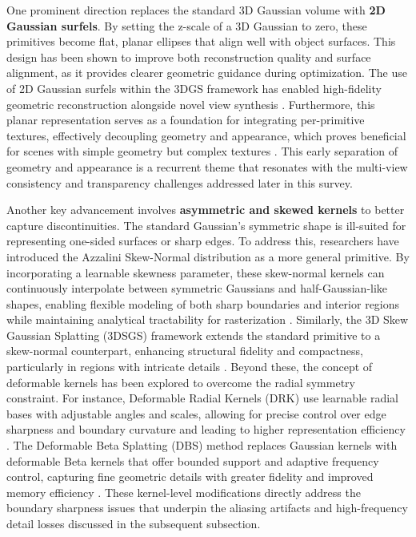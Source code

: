 \documentclass[11pt]{article}
\begin{document}
One prominent direction replaces the standard 3D Gaussian volume with \textbf{2D Gaussian surfels}. By setting the z-scale of a 3D Gaussian to zero, these primitives become flat, planar ellipses that align well with object surfaces. This design has been shown to improve both reconstruction quality and surface alignment, as it provides clearer geometric guidance during optimization. The use of 2D Gaussian surfels within the 3DGS framework has enabled high-fidelity geometric reconstruction alongside novel view synthesis \cite{ref21}. Furthermore, this planar representation serves as a foundation for integrating per-primitive textures, effectively decoupling geometry and appearance, which proves beneficial for scenes with simple geometry but complex textures \cite{ref55}. This early separation of geometry and appearance is a recurrent theme that resonates with the multi-view consistency and transparency challenges addressed later in this survey.

Another key advancement involves \textbf{asymmetric and skewed kernels} to better capture discontinuities. The standard Gaussian's symmetric shape is ill-suited for representing one-sided surfaces or sharp edges. To address this, researchers have introduced the Azzalini Skew-Normal distribution as a more general primitive. By incorporating a learnable skewness parameter, these skew-normal kernels can continuously interpolate between symmetric Gaussians and half-Gaussian-like shapes, enabling flexible modeling of both sharp boundaries and interior regions while maintaining analytical tractability for rasterization \cite{ref56}. Similarly, the 3D Skew Gaussian Splatting (3DSGS) framework extends the standard primitive to a skew-normal counterpart, enhancing structural fidelity and compactness, particularly in regions with intricate details \cite{ref57}. Beyond these, the concept of deformable kernels has been explored to overcome the radial symmetry constraint. For instance, Deformable Radial Kernels (DRK) use learnable radial bases with adjustable angles and scales, allowing for precise control over edge sharpness and boundary curvature and leading to higher representation efficiency \cite{ref58}. The Deformable Beta Splatting (DBS) method replaces Gaussian kernels with deformable Beta kernels that offer bounded support and adaptive frequency control, capturing fine geometric details with greater fidelity and improved memory efficiency \cite{ref59}. These kernel-level modifications directly address the boundary sharpness issues that underpin the aliasing artifacts and high-frequency detail losses discussed in the subsequent subsection.
\end{document}
